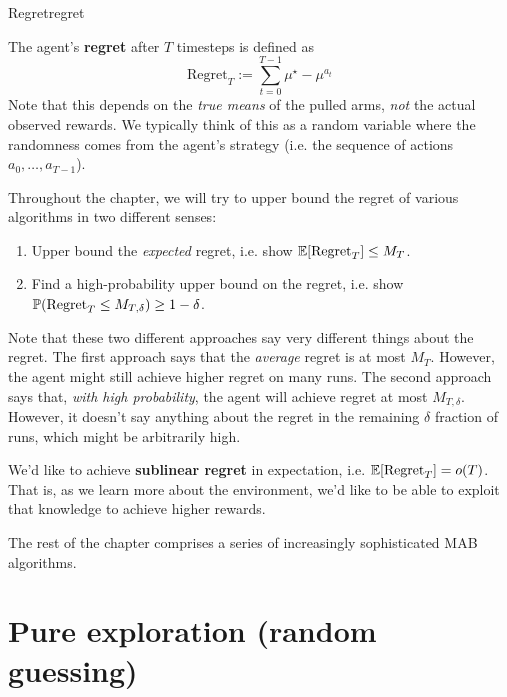 \documentclass[\main/main]{subfiles}
\begin{document}
\begin{definition}{Regret}{regret}
    
The agent's \textbf{regret} after $T$ timesteps is defined as
\begin{equation}
    \text{Regret}_T := \sum_{t=0}^{T-1} \mu^\star - \mu^{a_t}
\end{equation}
Note that this depends on the \emph{true means} of the pulled arms, \emph{not} the actual observed rewards. We typically think of this as a random variable where the randomness comes from the agent's strategy (i.e. the sequence of actions $a_0, \dots, a_{T-1}$).

Throughout the chapter, we will try to upper bound the regret of various algorithms in two different senses:
\begin{enumerate}
    \item Upper bound the \emph{expected} regret, i.e. show $\E[\text{Regret}_T] \le M_T$.
    \item Find a high-probability upper bound on the regret, i.e. show $\P(\text{Regret}_T \le M_{T, \delta}) \ge 1-\delta$.
\end{enumerate}
Note that these two different approaches say very different things about the regret. The first approach says that the \emph{average} regret is at most $M_T$. However, the agent might still achieve higher regret on many runs. The second approach says that, \emph{with high probability}, the agent will achieve regret at most $M_{T, \delta}$. However, it doesn't say anything about the regret in the remaining $\delta$ fraction of runs, which might be arbitrarily high.

\end{definition}

We'd like to achieve \textbf{sublinear regret} in expectation, i.e. $\E[\text{Regret}_T] = o(T)$. That is, as we learn more about the environment, we'd like to be able to exploit that knowledge to achieve higher rewards.

The rest of the chapter comprises a series of increasingly sophisticated MAB algorithms.

\section{Pure exploration (random guessing)}
\end{document}
